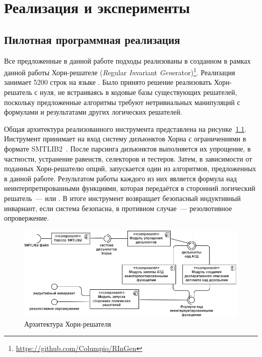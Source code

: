 \chapter{Реализация и эксперименты}\label{ch:evaluation}

\section{Пилотная программная реализация}
Все предложенные в данной работе подходы реализованы в созданном в рамках данной работы Хорн-решателе \theringen{} (\emph{R}egular \emph{In}variant \emph{Gen}erator)\footnote{\url{https://github.com/Columpio/RInGen}}.
Реализация занимает 5200 строк на языке \fsharp{}.
Было принято решение реализовать Хорн-решатель с нуля, не встраиваясь в кодовые базы существующих решателей, поскольку предложенные алгоритмы требуют нетривиальных манипуляций с формулами и результатами других логических решателей.


Общая архитектура реализованного инструмента представлена на рисунке~\ref{fig:ringen-arch}.
Инструмент \theringen{} принимает на вход систему дизъюнктов Хорна с ограничениями в формате SMTLIB2~\cite{BarFT-RR-17}.
После парсинга дизъюнктов выполняется их  упрощение, в частности, устранение равенств, селекторов и тестеров. Затем, в зависимости от поданных Хорн-решателю опций, запускается один из алгоритмов, предложенных в данной работе. Результатом работы каждого из них является формула над неинтерпретированными функциями, которая передаётся в сторонний логический решатель~---
 \vampire{} или \cvc{}.
В итоге инструмент возвращает безопасный индуктивный инвариант, если система безопасна, в противном случае~--- резолютивное опровержение.
\begin{figure}[h]
    \centering
    \includegraphics[width=\textwidth]{Dissertation/images/arch.png}
    \caption{Архитектура Хорн-решателя \theringen{}}
    \label{fig:ringen-arch}
\end{figure}


